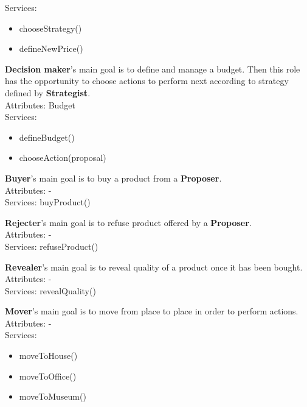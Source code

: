\documentclass[a4paper,11pt]{report}
\begin{document}
\begin{multicols}{2}
\begin{mdframed}
  Services:
  \begin{itemize}
    \itemsep0pt
    \item chooseStrategy()
    \item defineNewPrice()
  \end{itemize}
  \end{mdframed}
  \begin{mdframed}
  \textbf{Decision maker}'s main goal is to define and manage a budget. Then this 
  role has the opportunity to choose actions to perform next according to strategy 
  defined by \textbf{Strategist}.\\
  Attributes: Budget\\
  Services:
  \begin{itemize}
    \itemsep0pt
    \item defineBudget()
    \item chooseAction(proposal)
  \end{itemize}
  \end{mdframed}
  \begin{mdframed}
  \textbf{Buyer}'s main goal is to buy a product from a \textbf{Proposer}.\\
  Attributes: -\\
  Services: buyProduct()
  \end{mdframed}
  \begin{mdframed}
  \textbf{Rejecter}'s main goal is to refuse product offered by a \textbf{Proposer}.\\
  Attributes: -\\
  Services: refuseProduct()
  \end{mdframed}
  \begin{mdframed}
  \textbf{Revealer}'s main goal is to reveal quality of a product once it has been bought.\\
  Attributes: -\\
  Services: revealQuality()
  \end{mdframed}
  \begin{mdframed}
  \textbf{Mover}'s main goal is to move from place to place in order to perform actions.\\
  Attributes: -\\
  Services:
  \begin{itemize}
    \itemsep0pt
    \item moveToHouse()
    \item moveToOffice()
    \item moveToMuseum()
  \end{itemize}
  \end{mdframed}
  
  \end{multicols}
  
\end{document}
